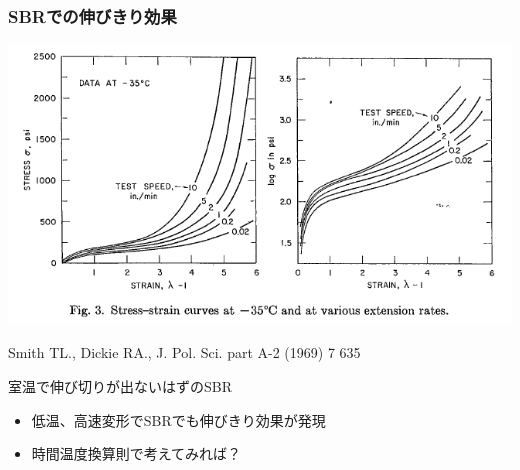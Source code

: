 \documentclass[12pt, dvipdfmx]{beamer}
\begin{document}
\begin{frame}
	\frametitle{SBRでの伸びきり効果}
		\includegraphics[width=.8\textwidth]{SBR_lowTemp_2.png}

		{\footnotesize Smith TL., Dickie RA., J. Pol. Sci. part A-2 (1969) 7 635}
		\begin{alertblock}{室温で伸び切りが出ないはずのSBR}
			\begin{itemize}
				\item 低温、高速変形でSBRでも伸びきり効果が発現
				\item 時間温度換算則で考えてみれば？
			\end{itemize}
		\end{alertblock}
\end{frame}
\end{document}
